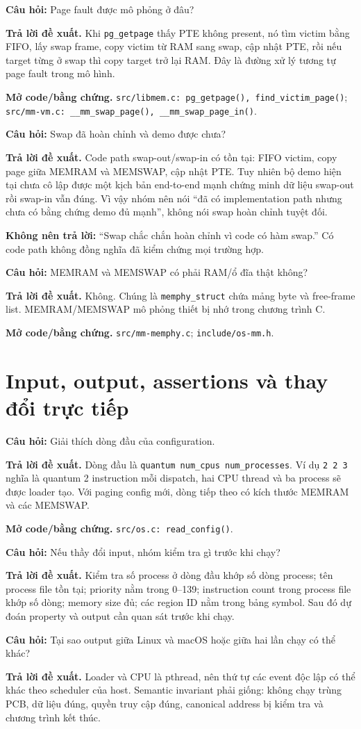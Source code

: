 \documentclass[11pt,a4paper]{article}
\newcommand{\code}[1]{\texttt{\color{navy}#1}}
\newcommand{\q}[1]{%
  \vspace{0.55em}\noindent
  \colorbox{pale}{\parbox{\dimexpr\textwidth-2\fboxsep}{\textbf{\color{navy}Câu hỏi:} #1}}%
  \par\vspace{0.3em}}
\newcommand{\ans}[1]{\textbf{\color{cyan}Trả lời đề xuất.} #1\par}
\newcommand{\proofcode}[1]{\textbf{\color{orange}Mở code/bằng chứng.} #1\par}
\newcommand{\danger}[1]{%
  \colorbox{palered}{\parbox{\dimexpr\textwidth-2\fboxsep}{\textbf{\color{red}Không nên trả lời:} #1}}\par}
\begin{document}
\q{Page fault được mô phỏng ở đâu?}
\ans{Khi \code{pg\_getpage} thấy PTE không present, nó tìm victim bằng FIFO,
lấy swap frame, copy victim từ RAM sang swap, cập nhật PTE, rồi nếu target từng
ở swap thì copy target trở lại RAM. Đây là đường xử lý tương tự page fault
trong mô hình.}
\proofcode{\code{src/libmem.c: pg\_getpage(), find\_victim\_page()};
\code{src/mm-vm.c: \_\_mm\_swap\_page(), \_\_mm\_swap\_page\_in()}.}

\q{Swap đã hoàn chỉnh và demo được chưa?}
\ans{Code path swap-out/swap-in có tồn tại: FIFO victim, copy page giữa MEMRAM
và MEMSWAP, cập nhật PTE. Tuy nhiên bộ demo hiện tại chưa cô lập được một
kịch bản end-to-end mạnh chứng minh dữ liệu swap-out rồi swap-in vẫn đúng.
Vì vậy nhóm nên nói ``đã có implementation path nhưng chưa có bằng chứng demo
đủ mạnh'', không nói swap hoàn chỉnh tuyệt đối.}
\danger{``Swap chắc chắn hoàn chỉnh vì code có hàm swap.'' Có code path không
đồng nghĩa đã kiểm chứng mọi trường hợp.}

\q{MEMRAM và MEMSWAP có phải RAM/ổ đĩa thật không?}
\ans{Không. Chúng là \code{memphy\_struct} chứa mảng byte và free-frame list.
MEMRAM/MEMSWAP mô phỏng thiết bị nhớ trong chương trình C.}
\proofcode{\code{src/mm-memphy.c}; \code{include/os-mm.h}.}

\section{Input, output, assertions và thay đổi trực tiếp}

\q{Giải thích dòng đầu của configuration.}
\ans{Dòng đầu là \code{quantum num\_cpus num\_processes}. Ví dụ
\code{2 2 3} nghĩa là quantum 2 instruction mỗi dispatch, hai CPU thread và ba
process sẽ được loader tạo. Với paging config mới, dòng tiếp theo có kích thước
MEMRAM và các MEMSWAP.}
\proofcode{\code{src/os.c: read\_config()}.}

\q{Nếu thầy đổi input, nhóm kiểm tra gì trước khi chạy?}
\ans{Kiểm tra số process ở dòng đầu khớp số dòng process; tên process file tồn
tại; priority nằm trong 0--139; instruction count trong process file khớp số
dòng; memory size đủ; các region ID nằm trong bảng symbol. Sau đó dự đoán
property và output cần quan sát trước khi chạy.}

\q{Tại sao output giữa Linux và macOS hoặc giữa hai lần chạy có thể khác?}
\ans{Loader và CPU là pthread, nên thứ tự các event độc lập có thể khác theo
scheduler của host. Semantic invariant phải giống: không chạy trùng PCB, dữ
liệu đúng, quyền truy cập đúng, canonical address bị kiểm tra và chương trình
kết thúc.}
\end{document}
